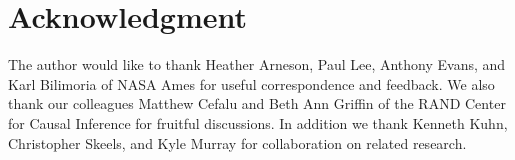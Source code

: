 \documentclass[conference]{IEEEtran}
\begin{document}







\section*{Acknowledgment}


The author would like to thank Heather Arneson, Paul Lee, Anthony Evans, and Karl Bilimoria of NASA Ames for useful correspondence and feedback.  We also thank our colleagues Matthew Cefalu and Beth Ann Griffin of the RAND Center for Causal Inference for fruitful discussions.  In addition we thank Kenneth Kuhn, Christopher Skeels, and Kyle Murray for collaboration on related research.




\end{document}
